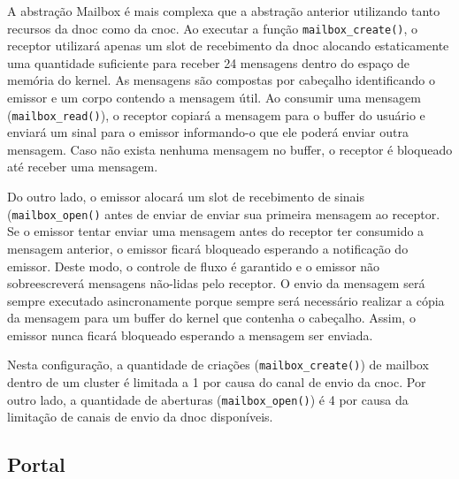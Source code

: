         A abstração Mailbox é mais complexa que a abstração anterior utilizando
        tanto recursos da dnoc como da cnoc.
        Ao executar a função \texttt{mailbox\_create()}, o receptor utilizará
        apenas um slot de recebimento da dnoc alocando estaticamente uma
        quantidade suficiente para receber 24 mensagens dentro do espaço
        de memória do kernel.
        As mensagens são compostas por cabeçalho identificando o emissor
        e um corpo contendo a mensagem útil.
        Ao consumir uma mensagem (\texttt{mailbox\_read()}), o receptor copiará
        a mensagem para o buffer do usuário e enviará um sinal para o emissor
        informando-o que ele poderá enviar outra mensagem.
        Caso não exista nenhuma mensagem no buffer, o receptor é bloqueado
        até receber uma mensagem.

        Do outro lado, o emissor alocará um slot de recebimento de sinais
        (\texttt{mailbox\_open()} antes de enviar de enviar sua primeira mensagem ao receptor.
        Se o emissor tentar enviar uma mensagem antes do receptor ter consumido
        a mensagem anterior, o emissor ficará bloqueado esperando a notificação
        do emissor.
        Deste modo, o controle de fluxo é garantido e o emissor não
        sobreescreverá mensagens não-lidas pelo receptor.
        O envio da mensagem será sempre executado asincronamente porque
        sempre será necessário realizar a cópia da mensagem para um
        buffer do kernel que contenha o cabeçalho.
        Assim, o emissor nunca ficará bloqueado esperando a mensagem ser enviada.

        Nesta configuração, a quantidade de criações (\texttt{mailbox\_create()}) de
        mailbox dentro de um cluster é limitada a 1 por causa do canal de envio da cnoc.
        Por outro lado, a quantidade de aberturas (\texttt{mailbox\_open()}) é 4 por
        causa da limitação de canais de envio da dnoc disponíveis.

    \subsection{Portal}



